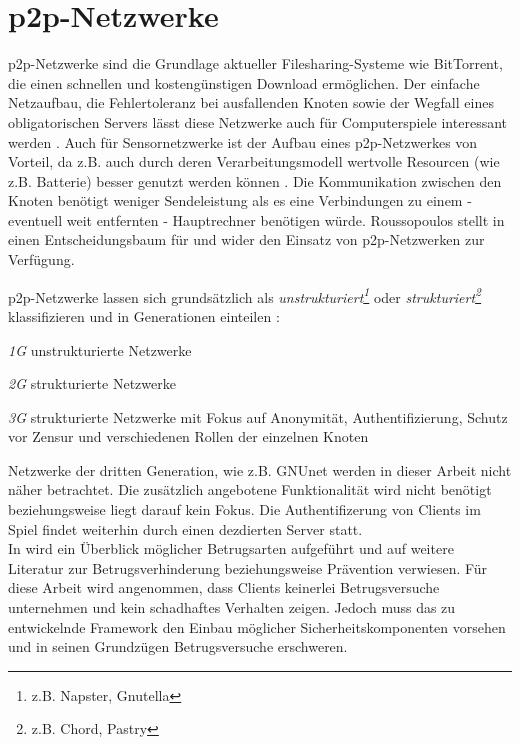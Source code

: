 \section{p2p-Netzwerke}
\label{chap:grundlagen:p2p}

p2p-Netzwerke sind die Grundlage aktueller Filesharing-Systeme wie BitTorrent, die einen schnellen und kostengünstigen Download ermöglichen. Der einfache Netzaufbau, die Fehlertoleranz bei ausfallenden Knoten sowie der Wegfall eines obligatorischen Servers lässt diese Netzwerke auch für Computerspiele interessant werden \cite{Knutsson2004Peertopeer, Triebel2008Peertopeer}. Auch für Sensornetzwerke ist der Aufbau eines p2p-Netzwerkes von Vorteil, da z.B. auch durch deren Verarbeitungsmodell wertvolle Resourcen (wie z.B. Batterie) besser genutzt werden können \cite{MuneebAliandKoenLangendoen2007Case, Sioutas2009Building}. Die Kommunikation zwischen den Knoten benötigt weniger Sendeleistung als es eine Verbindungen zu einem - eventuell weit entfernten - Hauptrechner benötigen würde. Roussopoulos stellt in \cite{Roussopoulos20032} einen Entscheidungsbaum für und wider den Einsatz von p2p-Netzwerken zur Verfügung.


p2p-Netzwerke lassen sich grundsätzlich als \emph{unstrukturiert\footnote{z.B. Napster, Gnutella}} oder \emph{strukturiert\footnote{z.B. Chord, Pastry}} klassifizieren \cite{Steinmetz2005, Lua2005Survey} und in Generationen einteilen \cite{Bo2003PeertoPeer}:
\begin{itemize*}
	\item \emph{1G} unstrukturierte Netzwerke
	\item \emph{2G} strukturierte Netzwerke
	\item \emph{3G} strukturierte Netzwerke mit Fokus auf Anonymität, Authentifizierung, Schutz vor Zensur und verschiedenen Rollen der einzelnen Knoten
\end{itemize*}

Netzwerke der dritten Generation, wie z.B. GNUnet \cite{Bennett2002GNet} werden in dieser Arbeit nicht näher betrachtet. Die zusätzlich angebotene Funktionalität wird nicht benötigt beziehungsweise liegt darauf kein Fokus. Die Authentifizerung von Clients im Spiel findet weiterhin durch einen dezdierten Server statt.\\
In  wird ein Überblick möglicher Betrugsarten aufgeführt und auf weitere Literatur zur Betrugsverhinderung beziehungsweise Prävention verwiesen. Für diese Arbeit wird angenommen, dass Clients keinerlei Betrugsversuche unternehmen und kein schadhaftes Verhalten zeigen. Jedoch muss das zu entwickelnde Framework den Einbau möglicher Sicherheitskomponenten vorsehen und in seinen Grundzügen Betrugsversuche erschweren.

